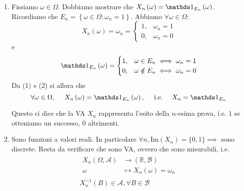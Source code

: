 \begin{enumerate}
\item Fissiamo $\omega \in \Omega $. Dobbiamo mostrare che $X_{n}\left( \omega \right) =\Ind_{E_{n}}\left( \omega \right)$. Ricordiamo che $E_{n} =\left\{\omega \in \Omega :\omega _{n} =1\right\}$. Abbiamo $\forall \omega \in \Omega $:
\begin{equation}
X_{n}\left( \omega \right) =\omega _{n} =
\begin{cases}
1, & \omega _{n} =1\\
0, & \omega _{n} =0
\end{cases}
\end{equation}
e
\begin{equation}
\Ind_{E_{n}}\left( \omega \right) =
\begin{cases}
1, & \omega \in E_{n} \iff \omega _{n} =1\\
0, & \omega \notin E_{n} \iff \omega _{n} =0
\end{cases}
\end{equation}
Da (1) e (2) si allora che
\begin{equation*}
\forall \omega \in \Omega ,\ \ \ \ X_{n}\left( \omega \right) =\Ind_{E_{n}}\left( \omega \right) ,\ \ \ \ \text{i.e.} \ \ \ \ X_{n} =\Ind_{E_{n}}
\end{equation*}

\begin{oss}
Questo ci dice che la VA $X_{n}$ rappresenta l'esito della $n$-esima prova, i.e. $1$ se otteniamo un successo, $0$ altrimenti.
\end{oss}
\item Sono funzioni a valori reali. In particolare $\forall n,\mathrm{Im}( X_{n}) =\{0,1\} \implies $ sono discrete. Resta da verificare che sono VA, ovvero che sono misurabili, i.e.
\begin{gather*}
\begin{aligned}
X_{n}( \Omega ,\mathcal{A}) & \rightarrow (\mathbb{R} ,\mathcal{B})\\
\omega  & \mapsto X_{n}( \omega ) =\omega _{n}
\end{aligned}\\
X_{n}^{-1}( B) \in \mathcal{A} ,\forall B\in \mathcal{B}
\end{gather*}


\end{enumerate}
